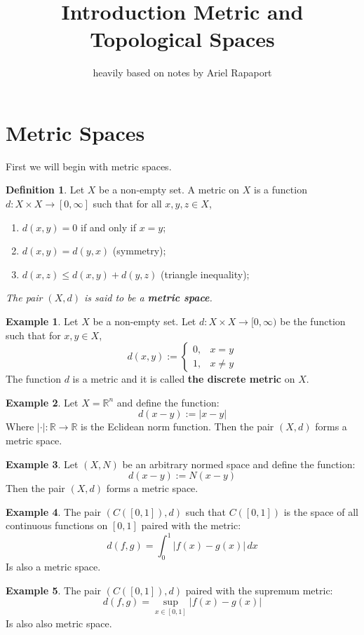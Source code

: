 \documentclass[11pt,a4paper]{article}
\title{\textbf{Introduction Metric and Topological Spaces}}
\author{heavily based on notes by Ariel Rapaport}
\date{}
\theoremstyle{definition}
\newtheorem{definition}{Definition}[section]
\newtheorem{example}{Example}[section]
\theoremstyle{plain}
\newcommand{\R}{\mathbb{R}}
\begin{document}
	\maketitle
	\newpage
	\section{Metric Spaces}
	First we will begin with metric spaces.
	\begin{definition}
	Let $X$ be a non-empty set. A metric on $X$ is a function 
	$d \colon X \times X \to [0,\infty]$ such that for all $x,y,z \in X$,
	\end{definition}
	\begin{enumerate}
	\item $d(x,y) = 0$ if and only if $x = y$;
	\item $d(x,y) = d(y,x)$ (symmetry);
	\item $d(x,z) \le d(x,y) + d(y,z)$ (triangle inequality);
	\end{enumerate}
	\emph{The pair $(X,d)$ is said to be a \textbf{metric space}.}
	\begin{example}
	Let $X$ be a non-empty set. Let $d \colon X \times X \to [0,\infty)$ be
	the function such that for $x,y \in X$,
	\[
		d(x,y) := \begin{cases}
			0, & x=y \\
			1, & x \neq y
		\end{cases}
	\]
	The function $d$ is a metric and it is called \textbf{the discrete metric}
	on $X$.
	\end{example}
	\begin{example}
	Let $X = \R^n$ and define the function:
	\[
		d(x-y) := |x - y|
	\]
	Where $|\cdot | \colon \R \to \R$ is the Eclidean norm function. 
	Then the pair $(X, d)$ forms a metric space.
	\end{example}
	\begin{example}
	Let $(X, N)$ be an arbitrary normed space and define the function:
	\[
		d(x-y) := N(x - y)
	\] 
	Then the pair $(X, d)$ forms a metric space.
	\end{example}
	\begin{example}
	The pair $(C([0,1]), d)$ such that $C([0,1])$ is the space of all
	continuous functions on $[0,1]$ paired with the metric:
	\[
		d(f,g) = \int_{0}^{1}{|f(x) - g(x)|\,dx}
	\]
	Is also a metric space.
	\end{example}
	\begin{example}
	The pair $(C([0,1]), d)$ paired with the supremum metric:
	\[
		d(f,g) = \sup_{x \in [0,1]}{|f(x) - g(x)|}
	\]
	Is also also metric space.
	\end{example}
\end{document}
